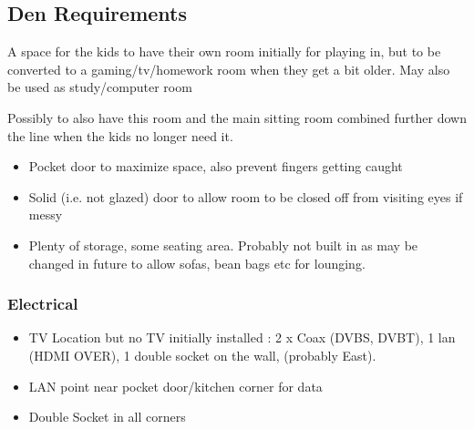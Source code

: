 \subsection{Den Requirements}
A space for the kids to have their own room initially for playing in, but to be converted to a gaming/tv/homework room
when they get a bit older. May also be used as study/computer room

Possibly to also have this room and the main sitting room combined further down the line when the kids no longer need it.
\begin{itemize}
\item Pocket door to maximize space, also prevent fingers getting caught
\item Solid (i.e. not glazed) door to allow room to be closed off from visiting eyes if messy
\item Plenty of storage, some seating area. Probably not built in as may be changed in future to allow sofas, bean bags etc for lounging.
\end{itemize}


\subsubsection{Electrical}
\begin{itemize}
\item TV Location but no TV initially installed : 2 x Coax (DVBS, DVBT), 1 lan (HDMI OVER), 1 double socket on the wall, (probably East).
\item LAN point near pocket door/kitchen corner for data
\item Double Socket in all corners
\end{itemize}
